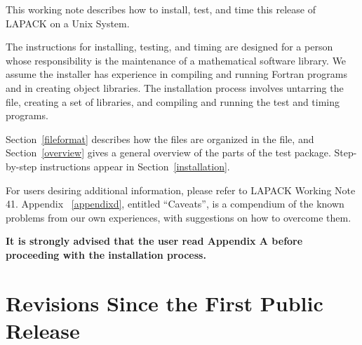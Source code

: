 \documentclass[11pt]{report}
\begin{document}
This working note describes how to install, test, and time this
release of LAPACK on a Unix System.

The instructions for installing, testing, and timing are designed for a 
person whose
responsibility is the maintenance of a mathematical software library.
We assume the installer has experience in compiling and running 
Fortran programs and in creating object libraries.
The installation process involves untarring the file, creating a set of
libraries, and compiling and running the test and timing programs.


Section~\ref{fileformat} describes how the files are organized in the
file, and
Section~\ref{overview} gives a general overview of the parts of the test package.
Step-by-step instructions appear in Section~\ref{installation}.

For users desiring additional information, please refer to LAPACK
Working Note 41.
Appendix ~\ref{appendixd}, entitled ``Caveats'', is a compendium of the known 
problems from our own experiences, with suggestions on how to 
overcome them.

\textbf{It is strongly advised that the user read Appendix
A before proceeding with the installation process.}

\section{Revisions Since the First Public Release}
\end{document}
